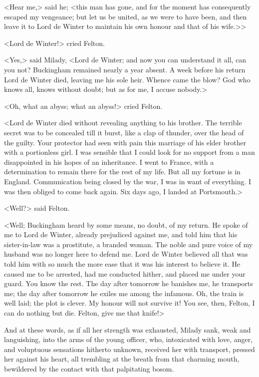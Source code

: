 <Hear me,> said he; <this man has gone, and for the moment has consequently escaped my vengeance; but let us be united, as we were to have been, and then leave it to Lord de Winter to maintain his own honour and that of his wife.>> 

<Lord de Winter!> cried Felton. 

<Yes,> said Milady, <Lord de Winter; and now you can understand it all, can you not? Buckingham remained nearly a year absent. A week before his return Lord de Winter died, leaving me his sole heir. Whence came the blow? God who knows all, knows without doubt; but as for me, I accuse nobody.> 

<Oh, what an abyss; what an abyss!> cried Felton. 

<Lord de Winter died without revealing anything to his brother. The terrible secret was to be concealed till it burst, like a clap of thunder, over the head of the guilty. Your protector had seen with pain this marriage of his elder brother with a portionless girl. I was sensible that I could look for no support from a man disappointed in his hopes of an inheritance. I went to France, with a determination to remain there for the rest of my life. But all my fortune is in England. Communication being closed by the war, I was in want of everything. I was then obliged to come back again. Six days ago, I landed at Portsmouth.> 

<Well?> said Felton. 

<Well; Buckingham heard by some means, no doubt, of my return. He spoke of me to Lord de Winter, already prejudiced against me, and told him that his sister-in-law was a prostitute, a branded woman. The noble and pure voice of my husband was no longer here to defend me. Lord de Winter believed all that was told him with so much the more ease that it was his interest to believe it. He caused me to be arrested, had me conducted hither, and placed me under your guard. You know the rest. The day after tomorrow he banishes me, he transports me; the day after tomorrow he exiles me among the infamous. Oh, the train is well laid; the plot is clever. My honour will not survive it! You see, then, Felton, I can do nothing but die. Felton, give me that knife!> 

And at these words, as if all her strength was exhausted, Milady sank, weak and languishing, into the arms of the young officer, who, intoxicated with love, anger, and voluptuous sensations hitherto unknown, received her with transport, pressed her against his heart, all trembling at the breath from that charming mouth, bewildered by the contact with that palpitating bosom. 

